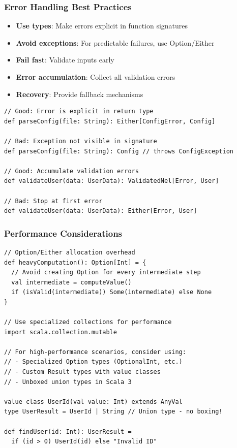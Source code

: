 \documentclass{beamer}
\begin{document}
\begin{frame}[fragile]
\frametitle{Error Handling Best Practices}

\begin{itemize}
\item \textbf{Use types}: Make errors explicit in function signatures
\item \textbf{Avoid exceptions}: For predictable failures, use Option/Either
\item \textbf{Fail fast}: Validate inputs early
\item \textbf{Error accumulation}: Collect all validation errors
\item \textbf{Recovery}: Provide fallback mechanisms
\end{itemize}

\begin{lstlisting}[style=scalaStyle]
// Good: Error is explicit in return type
def parseConfig(file: String): Either[ConfigError, Config]

// Bad: Exception not visible in signature
def parseConfig(file: String): Config // throws ConfigException

// Good: Accumulate validation errors
def validateUser(data: UserData): ValidatedNel[Error, User]

// Bad: Stop at first error
def validateUser(data: UserData): Either[Error, User]
\end{lstlisting}

\end{frame}

\begin{frame}[fragile]
\frametitle{Performance Considerations}

\begin{lstlisting}[style=scalaStyle]
// Option/Either allocation overhead
def heavyComputation(): Option[Int] = {
  // Avoid creating Option for every intermediate step
  val intermediate = computeValue()
  if (isValid(intermediate)) Some(intermediate) else None
}

// Use specialized collections for performance
import scala.collection.mutable

// For high-performance scenarios, consider using:
// - Specialized Option types (OptionalInt, etc.)
// - Custom Result types with value classes
// - Unboxed union types in Scala 3

value class UserId(val value: Int) extends AnyVal
type UserResult = UserId | String // Union type - no boxing!

def findUser(id: Int): UserResult = 
  if (id > 0) UserId(id) else "Invalid ID"
\end{lstlisting}

\end{frame}
\end{document}
